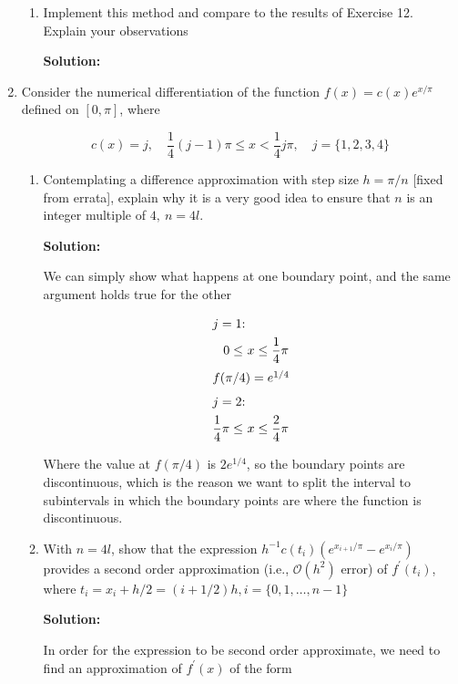 \documentclass[12pt]{article}
\newcommand{\BigO}[1]{\mathcal{O}\left( #1 \right)}
\begin{document}
\begin{enumerate}
\begin{enumerate}
\item Implement this method and compare to the results of Exercise 12. Explain your observations

{\bf Solution:}
\end{enumerate}

\item Consider the numerical differentiation of the function $f(x) = c(x) e^{x/\pi}$ defined on $[0, \pi]$, where 

\[
	c(x) = j, \quad \frac{1}{4}(j-1)\pi \leq x < \frac{1}{4}j\pi, \quad j = \{ 1, 2, 3, 4\}
\]

\begin{enumerate}
\item Contemplating a difference approximation with step size $h = \pi/n$ [fixed from errata], explain why it is a very good idea to ensure that $n$ is an integer multiple of $4,\ n = 4l$. 

{\bf Solution:}

We can simply show what happens at one boundary point, and the same argument holds true for the other

\begin{align*}
\intertext{$j = 1$:}
0 \leq\ &x \leq \frac{1}{4}\pi\\
\intertext{$f(\pi/4) = e^{1/4}$}
\intertext{$j = 2$:}
\frac{1}{4}\pi \leq\ &x \leq \frac{2}{4}\pi
\end{align*}

Where the value at $f(\pi/4)$ is $2e^{1/4}$, so the boundary points are discontinuous, which is the reason we want to split the interval to subintervals in which the boundary points are where the function is discontinuous.

\item With $n = 4l$, show that the expression $h^{-1}c(t_{i})\left( e^{x_{i+1}/\pi} - e^{x_{i}/\pi}\right)$ provides a second order approximation (i.e., $\BigO{h^{2}}$ error) of $f^{\prime}(t_{i})$, where $t_{i} = x_{i} + h/2 = (i + 1/2)h, i = \{ 0, 1, \ldots, n-1\}$

{\bf Solution:}

In order for the expression to be second order approximate, we need to find an approximation of $f^{\prime}(x)$ of the form


\end{enumerate}
\end{enumerate}
\end{document}
